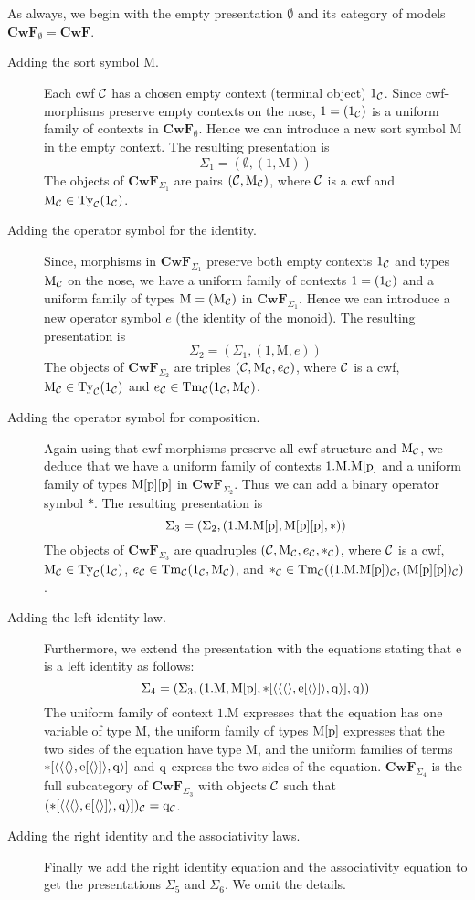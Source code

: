 \documentclass{mscs}
\newcommand{\FYI}[1]{{#1}}
\def\Cwf{\mathbf{CwF}}
\def\Mon{\mathrm{M}}
\def\idmon{\mathrm{e}}
\def\comp{\mathrm{*}}
\begin{document}
As always, we begin with the empty \FYI{presentation} $\emptyset$ and its category of models $\Cwf_\emptyset = \Cwf$.
\begin{description}
\item[Adding the sort symbol $\Mon$.] Each cwf ${\mathcal C}$ has a chosen empty context (terminal object) $1_{\mathcal C}$. Since cwf-morphisms preserve empty contexts on the nose, $1 = (1_{\mathcal C})$ is a uniform family of contexts in $\Cwf_\emptyset$. Hence we can introduce a new sort symbol $\Mon$ in the empty context. The resulting \FYI{presentation} is
$$
\Sigma_1 = (\emptyset, (1,\Mon))
$$
The objects of $\Cwf_{\Sigma_1}$  are pairs $(\C,\Mon_\C)$, where ${\mathcal C}$ is a cwf and $\Mon_\C \in \Ty_\C(1_\C)$.
\item[Adding the operator symbol for the identity.]
Since, morphisms in $\Cwf_{\Sigma_1}$ preserve both empty contexts $1_{\mathcal C}$ and types $\Mon_\C$ on the nose, we have a uniform family of contexts $1 = (1_{\mathcal C})$ and a uniform family of types $\Mon = (\Mon_\C)$ in $\Cwf_{\Sigma_1}$. Hence we can introduce a new operator symbol $e$ (the identity of the monoid).  The resulting \FYI{presentation} is
$$
\Sigma_2 = (\Sigma_1, (1,\Mon,e))
$$
The objects of $\Cwf_{\Sigma_2}$  are triples $(\C,\Mon_\C,e_\C)$, where ${\mathcal C}$ is a cwf, $\Mon_\C \in \Ty_\C(1_\C)$ and $e_\C \in \Tm_\C(1_\C,\Mon_\C)$.
\item[Adding the operator symbol for composition.]
Again using that cwf-morphisms preserve all cwf-structure and $\Mon_\C$, we deduce that we have a uniform family of contexts $1.\Mon.\Mon[\p]$ and a uniform family of types $\Mon[\p][\p]$ in $\Cwf_{\Sigma_2}$. Thus we can add a binary operator symbol $\comp$. The resulting \FYI{presentation} is
$$
\Sigma_3 = (\Sigma_2, (1.\Mon.\Mon[\p],\Mon[\p][\p],\comp))
$$
The objects of $\Cwf_{\Sigma_3}$  are quadruples $(\C,\Mon_\C,e_\C,*_\C)$, where ${\mathcal C}$ is a cwf, $\Mon_\C \in \Ty_\C(1_\C)$, $e_\C \in \Tm_\C(1_\C,\Mon_\C)$, and $*_\C \in \Tm_\C((1.\Mon.\Mon[\p])_\C,(\Mon[\p][\p])_\C)$.
\item[Adding the left identity law.]
Furthermore, we extend the \FYI{presentation} with the equations stating that $\idmon$ is a left identity as follows:
$$
\Sigma_4 = (\Sigma_3, (1.\Mon, \Mon[\p], \comp[\tuple{\tuple{\tuple{},\idmon[\tuple{}]},\q}], \q))
$$
The uniform family of context $1.\Mon$ expresses that the equation has one variable of type $\Mon$, the uniform family of types $\Mon[\p]$ expresses that the two sides of the equation have type $\Mon$, and the uniform families of terms $\comp[\tuple{\tuple{\tuple{},\idmon[\tuple{}]},\q}]$ and $\mathrm{q}$ express the two sides of the equation.
$\Cwf_{\Sigma_4}$ is the full subcategory of $\Cwf_{\Sigma_3}$ with objects ${\mathcal C}$
such that $(\comp[\tuple{\tuple{\tuple{},\idmon[\tuple{}]},\q}])_\C = \q_\C$.
\item[Adding the right identity and the associativity laws.]
Finally we add the right identity equation and the associativity equation to get the \FYI{presentations} $\Sigma_5$ and $\Sigma_6$. We omit the details.
\end{description}
\end{document}

